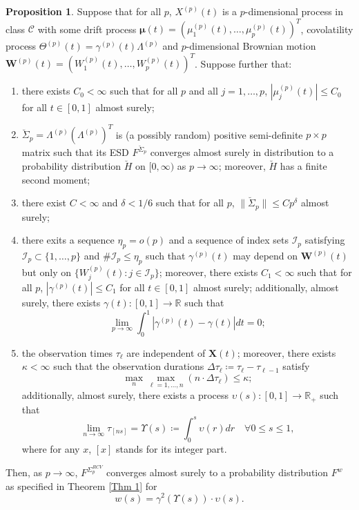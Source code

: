 \documentclass[a4paper,11pt]{book}
\theoremstyle{plain}
\theoremstyle{definition}
\newtheorem{prps}[thm]{Proposition}
\newcommand{\MR}{\mathbb{R}}
\begin{document}
    \begin{prps} \label{prps ups}
    	Suppose that for all $p$, $X^{(p)}(t)$ is a $p$-dimensional process in class $\mathcal{C}$ with some drift process $\boldsymbol{\mu}(t) = (\mu_1^{(p)}(t), \dots, \mu_p^{(p)}(t))^T$, covolatility process $\Theta^{(p)}(t) = \gamma^{(p)}(t) \Lambda^{(p)}$ and $p$-dimensional Brownian motion $\mathbf{W}^{(p)}(t) = (W_1^{(p)}(t), \dots, W_p^{(p)}(t) )^T$. Suppose further that:
    	\begin{enumerate}
    		\item there exists $C_0 < \infty$ such that for all $p$ and all $j = 1, \dots, p$, $|\mu_j^{(p)}(t)| \leq C_0$ for all $t \in [0, 1]$ almost surely;
    		\item $\breve{\Sigma}_p = \Lambda^{(p)} ( \Lambda^{(p)})^T $ is (a possibly random) positive semi-definite $p \times p$ matrix such that its ESD $F^{\breve{\Sigma}_p}$ converges almost surely in distribution to a probability distribution $\breve{H}$ on $[0,\infty)$ as $p \rightarrow \infty$; moreover, $\breve{H}$ has a finite second moment;
    		\item there exist $C < \infty$ and $\delta < 1/6$ such that for all $p$, $\|\breve{\Sigma}_p \| \leq Cp^\delta$ almost surely;
    		\item there exits a sequence $\eta_p = o(p)$ and a sequence of index sets $\mathcal{I}_p$ satisfying $\mathcal{I}_p \subset \{1, \dots, p\}$ and $\#\mathcal{I}_p \leq \eta_p$ such that $\gamma^{(p)}(t)$ may depend on $\mathbf{W}^{(p)}(t)$ but only on $\{W_j^{(p)}(t): j \in \mathcal{I}_p\}$; moreover, there exists $C_1 < \infty$ such that for all $p$, $|\gamma^{(p)}(t)| \leq C_1$ for all $t \in [0, 1]$ almost surely; additionally, almost surely, there exists $\gamma(t): [0, 1] \rightarrow \MR$ such that
    		\[ \lim_{p \rightarrow \infty} \int_{0}^{1} |\gamma^{(p)}(t) - \gamma(t) |dt = 0;  \]
    		\item the observation times $\tau_\ell$ are independent of $\mathbf{X}(t)$; moreover, there exists $\kappa < \infty$ such that the observation durations $\Delta \tau_\ell \coloneqq  \tau_\ell - \tau_{\ell-1}$ satisfy
    		\[ \max_{n} \max_{\ell = 1, \dots, n} (n \cdot \Delta \tau_\ell ) \leq \kappa; \]
    		additionally, almost surely, there exists a process $\upsilon(s) : [0, 1] \rightarrow \MR_+$ such that
    		\[ \lim_{n \rightarrow \infty} \tau_{[ns]} = \Upsilon(s) \coloneqq  \int_{0}^{s} \upsilon(r) dr \quad \forall 0 \leq s \leq 1, \]
    		where for any $x$, $[x]$ stands for its integer part.
     	\end{enumerate}
     	Then, as $p \rightarrow \infty$, $F^{\Sigma_p^{RCV}}$ converges almost surely to a probability distribution $F^w$ as specified in Theorem \ref{Thm 1} for
     	\[ w(s) = \gamma^2(\Upsilon(s)) \cdot \upsilon(s). \]
    \end{prps}
    
\end{document}
